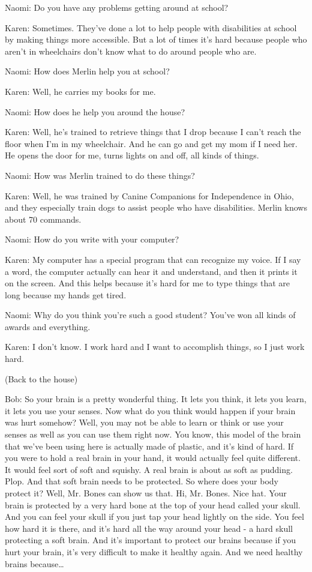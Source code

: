 Naomi: Do you have any problems getting around at school?

Karen: Sometimes. They've done a lot to help people with disabilities at school by making things more accessible. But a lot of times it's hard because people who aren't in wheelchairs don't know what to do around people who are.

Naomi: How does Merlin help you at school?

Karen: Well, he carries my books for me.

Naomi: How does he help you around the house?

Karen: Well, he's trained to retrieve things that I drop because I can't reach the floor when I'm in my wheelchair. And he can go and get my mom if I need her. He opens the door for me, turns lights on and off, all kinds of things.

Naomi: How was Merlin trained to do these things?

Karen: Well, he was trained by Canine Companions for Independence in Ohio, and they especially train dogs to assist people who have disabilities. Merlin knows about 70 commands.

Naomi: How do you write with your computer?

Karen: My computer has a special program that can recognize my voice. If I say a word, the computer actually can hear it and understand, and then it prints it on the screen. And this helps because it's hard for me to type things that are long because my hands get tired.

Naomi: Why do you think you're such a good student? You've won all kinds of awards and everything.

Karen: I don't know. I work hard and I want to accomplish things, so I just work hard.

(Back to the house)

Bob: So your brain is a pretty wonderful thing. It lets you think, it lets you learn, it lets you use your senses. Now what do you think would happen if your brain was hurt somehow? Well, you may not be able to learn or think or use your senses as well as you can use them right now. You know, this model of the brain that we've been using here is actually made of plastic, and it's kind of hard. If you were to hold a real brain in your hand, it would actually feel quite different. It would feel sort of soft and squishy. A real brain is about as soft as pudding. Plop. And that soft brain needs to be protected. So where does your body protect it? Well, Mr. Bones can show us that. Hi, Mr. Bones. Nice hat. Your brain is protected by a very hard bone at the top of your head called your skull. And you can feel your skull if you just tap your head lightly on the side. You feel how hard it is there, and it's hard all the way around your head - a hard skull protecting a soft brain. And it's important to protect our brains because if you hurt your brain, it's very difficult to make it healthy again. And we need healthy brains because\dots

